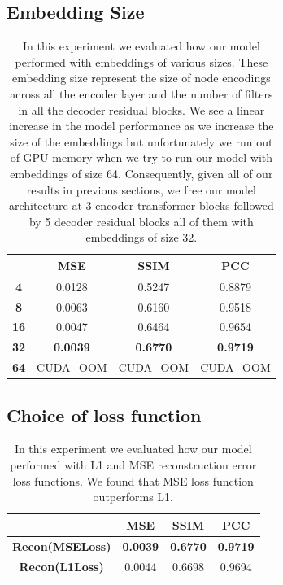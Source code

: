 \subsection{Embedding Size}
\begin{table}[H]
\centering
\begin{tabular}{cccc}
\hline
            & \textbf{MSE}    & \textbf{SSIM}   & \textbf{PCC}    \\ \hline
\textbf{4}  & 0.0128          & 0.5247          & 0.8879          \\
\textbf{8}  & 0.0063          & 0.6160          & 0.9518          \\
\textbf{16} & 0.0047          & 0.6464          & 0.9654          \\
\textbf{32} & \textbf{0.0039} & \textbf{0.6770} & \textbf{0.9719} \\
\textbf{64} & CUDA\_OOM       & CUDA\_OOM       & CUDA\_OOM       \\ \hline
\end{tabular}
\caption{
    \label{supp-tab:embedding-size-eval} In this experiment we evaluated how our model performed with embeddings of various sizes. These embedding size represent the size of node encodings across all the encoder layer and the number of filters in all the decoder residual blocks. We see a linear increase in the model performance as we increase the size of the embeddings but unfortunately we run out of GPU memory when we try to run our model with embeddings of size 64. Consequently, given all of our results in previous sections, we free our model architecture at 3 encoder transformer blocks followed by 5 decoder residual blocks all of them with embeddings of size 32.  
}
\end{table}


\subsection{Choice of loss function}
\begin{table}[H]
\centering
\begin{tabular}{cccc}
\hline
                        & \textbf{MSE}    & \textbf{SSIM}   & \textbf{PCC}    \\ \hline
\textbf{Recon(MSELoss)} & \textbf{0.0039} & \textbf{0.6770} & \textbf{0.9719} \\
\textbf{Recon(L1Loss)}  & 0.0044          & 0.6698          & 0.9694          \\ \hline
\end{tabular}
\caption{
    \label{supp-tab:loss-function-eval} In this experiment we evaluated how our model performed with L1 and MSE reconstruction error loss functions. We found that MSE loss function outperforms L1. 
}
\end{table}

